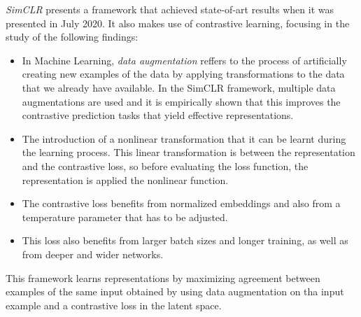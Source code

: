 \emph{SimCLR} \citep{chen_simple_2020} presents a framework that achieved state-of-art results when it was presented in July 2020. It also makes use of contrastive learning, focusing in the study of the following findings:
\begin{itemize}
\item In Machine Learning, \emph{data augmentation} reffers to the process of artificially creating new examples of the data by applying transformations to the data that we already have available. In the SimCLR framework, multiple data augmentations are used and it is empirically shown that this improves the contrastive prediction tasks that yield effective representations.

\item The introduction of a nonlinear transformation that it can be learnt during the learning process. This linear transformation is between the representation and the contrastive loss, so before evaluating the loss function, the representation is applied the nonlinear function.

\item The contrastive loss benefits from normalized embeddings and also from a temperature parameter that has to be adjusted.

\item This loss also benefits from larger batch sizes and longer training, as well as from deeper and wider networks.
\end{itemize}

This framework learns representations by maximizing agreement between examples of the same input obtained by using data augmentation on tha input example and a contrastive loss in the latent space.